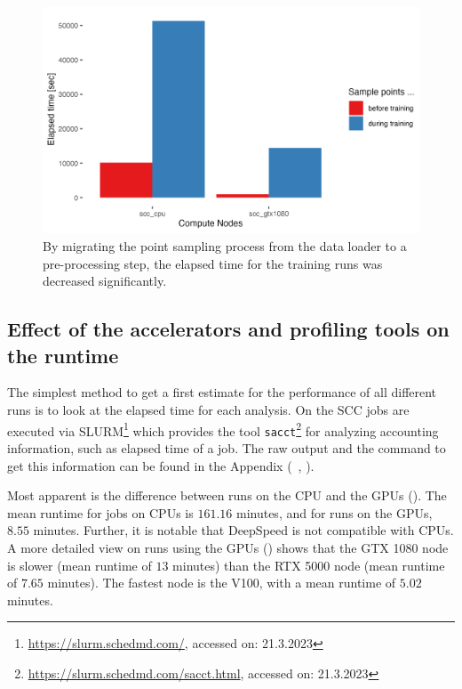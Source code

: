 \documentclass[12pt, a4paper, hidelinks]{article}
\begin{document}
\begin{figure}[H]
\centering
\includegraphics[width=1\textwidth]{./assets/sacct_barplot_by_nodes_sample-points-effect}
\vspace{-1em}
\caption[Effect of the data loading optimization]{By migrating the point sampling process from the data loader to a pre-processing step, the elapsed time for the training runs was decreased significantly.}
\label{fig:sacct_barplot_by_nodes_sample-points-effect}
\end{figure}

\subsection{Effect of the accelerators and profiling tools on the runtime}
\label{sec:r-runtime}

The simplest method to get a first estimate for the performance of all different runs is to look at the elapsed time for each analysis. On the \ac{SCC} jobs are executed via SLURM\footnote{\url{https://slurm.schedmd.com/}, accessed on: 21.3.2023} which provides the tool \texttt{sacct}\footnote{\url{https://slurm.schedmd.com/sacct.html}, accessed on: 21.3.2023} for analyzing accounting information, such as elapsed time of a job. The raw output and the command to get this information can be found in the Appendix (~, ). 

Most apparent is the difference between runs on the \ac{CPU} and the \ac{GPU}s (). The mean runtime for jobs on \ac{CPU}s is $161.16$ minutes, and for runs on the \ac{GPU}s, $8.55$ minutes. Further, it is notable that DeepSpeed is not compatible with \ac{CPU}s. A more detailed view on runs using the \ac{GPU}s () shows that the GTX 1080 node is slower (mean runtime of $13$ minutes) than the RTX 5000 node (mean runtime of $7.65$ minutes). The fastest node is the V100, with a mean runtime of $5.02$ minutes.
\end{document}
